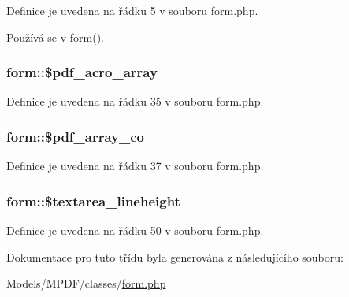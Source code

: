 Definice je uvedena na řádku 5 v souboru form.\-php.



Používá se v form().

\hypertarget{classform_a1131119fb5ac1a1907a5c4830a710322}{
\subsubsection[{\$pdf\-\_\-acro\-\_\-array}]{\setlength{\rightskip}{0pt plus 5cm}form\-::\$pdf\-\_\-acro\-\_\-array}}\label{classform_a1131119fb5ac1a1907a5c4830a710322}


Definice je uvedena na řádku 35 v souboru form.\-php.

\hypertarget{classform_a15a296bb9cebb0c6edc191ff8194b4a9}{
\subsubsection[{\$pdf\-\_\-array\-\_\-co}]{\setlength{\rightskip}{0pt plus 5cm}form\-::\$pdf\-\_\-array\-\_\-co}}\label{classform_a15a296bb9cebb0c6edc191ff8194b4a9}


Definice je uvedena na řádku 37 v souboru form.\-php.

\hypertarget{classform_a1e001f1e7be1b653cb72c9867601adab}{
\subsubsection[{\$textarea\-\_\-lineheight}]{\setlength{\rightskip}{0pt plus 5cm}form\-::\$textarea\-\_\-lineheight}}\label{classform_a1e001f1e7be1b653cb72c9867601adab}


Definice je uvedena na řádku 50 v souboru form.\-php.



Dokumentace pro tuto třídu byla generována z následujícího souboru\-:\begin{DoxyCompactItemize}
\item 
Models/\-M\-P\-D\-F/classes/\hyperlink{form_8php}{form.\-php}\end{DoxyCompactItemize}
